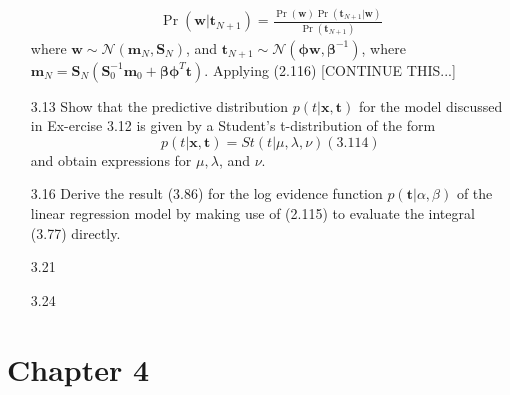 \documentclass[]{article}
\begin{document}
\begin{enumerate}
	\begin{align*}
	\Pr(\mathbf{w}|\mathbf{t}_{N+1})=\frac{\Pr(\mathbf{w})\Pr(\mathbf{t}_{N+1}|\mathbf{w})}{\Pr(\mathbf{t}_{N+1})}
	\end{align*}
	where $\mathbf{w} \sim \mathcal{N}(\mathbf{m}_N, \mathbf{S}_N)$, and $\mathbf{t}_{N+1} \sim \mathcal{N}(\bm{\phi}\mathbf{w}, \bm{\beta}^{-1})$, where $\mathbf{m}_N=\mathbf{S}_N(\mathbf{S}_0^{-1}\mathbf{m}_0+\bm{\beta}\bm{\phi}^T\mathbf{t})$. Applying (2.116) [CONTINUE THIS...]
	\item[3.13] Show that the predictive distribution $p(t|\mathbf{x}, \mathbf{t})$ for the model discussed in Ex-ercise 3.12 is given by a Student’s t-distribution of the form $$p(t|\mathbf{x}, \mathbf{t}) = St(t|\mu, \lambda, \nu) (3.114)$$
and obtain expressions for $\mu, \lambda$, and $ \nu$.
	\item[3.16] Derive the result (3.86) for the log evidence function $p(\mathbf{t}|\alpha, \beta)$ of the linear regression model by making use of (2.115) to evaluate the integral (3.77) directly.
	\item[3.21]
	\item[3.24]
\end{enumerate}
\section*{Chapter 4}
\end{document}
